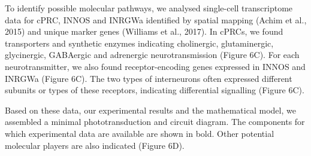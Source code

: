 \documentclass[
  10pt,
  onecolumn]{article}
\begin{document}
To identify possible molecular pathways, we analysed single-cell
transcriptome data for cPRC, INNOS and INRGWa identified by spatial
mapping (Achim et al., 2015) and unique marker genes (Williams et al.,
2017). In cPRCs, we found transporters and synthetic enzymes indicating
cholinergic, glutaminergic, glycinergic, GABAergic and adrenergic
neurotransmission (Figure 6C). For each neurotransmitter, we also found
receptor-encoding genes expressed in INNOS and INRGWa (Figure 6C). The
two types of interneurons often expressed different subunits or types of
these receptors, indicating differential signalling (Figure 6C).

Based on these data, our experimental results and the mathematical
model, we assembled a minimal phototransduction and circuit diagram. The
components for which experimental data are available are shown in bold.
Other potential molecular players are also indicated (Figure 6D).
\end{document}
